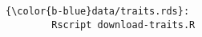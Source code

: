 \documentclass[class=minimal,border=0]{standalone}
\begin{document}
%
\begin{BVerbatim}[bgcolor=b-darkgrey]
{\color{b-blue}data/traits.rds}:
        Rscript download-traits.R
\end{BVerbatim}
\end{document}
